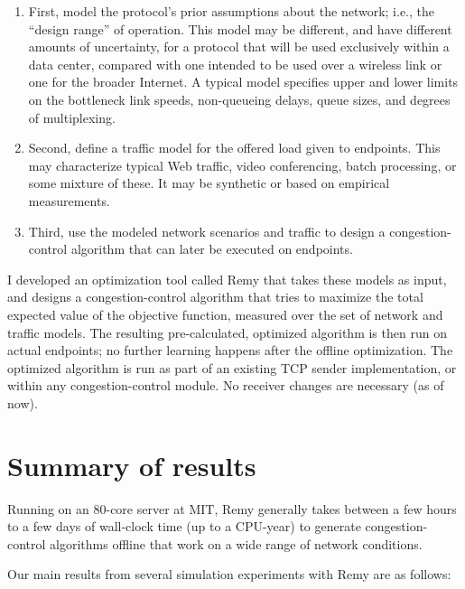 \begin{enumerate}

\item First, model the protocol's prior assumptions about the network;
  i.e., the ``design range'' of operation. This model
  may be different, and have different amounts of uncertainty, for a
  protocol that will be used exclusively within a data center,
  compared with one intended to be used over a wireless link or one
  for the broader Internet. A typical model specifies upper and lower
  limits on the bottleneck link speeds, non-queueing delays, queue
  sizes, and degrees of multiplexing.

\item Second, define a traffic model for the offered load given to
  endpoints. This may characterize typical Web traffic, video
  conferencing, batch processing, or some mixture of these. It may
  be synthetic or based on empirical measurements.

\item Third, use the modeled network scenarios and traffic to design a
  congestion-control algorithm that can later be executed on endpoints.

\end{enumerate}

I developed an optimization tool called Remy that takes these models
as input, and designs a congestion-control algorithm that tries to
maximize the total expected value of the objective function, measured
over the set of network and traffic models. The resulting
pre-calculated, optimized algorithm is then run on actual endpoints;
no further learning happens after the offline optimization. The
optimized algorithm is run as part of an existing TCP sender
implementation, or within any congestion-control module. No receiver
changes are necessary (as of now).

\section{Summary of results}

Running on an 80-core server at MIT, Remy generally takes between a
few hours to a few days of wall-clock time (up to a CPU-year) to
generate congestion-control algorithms offline that work on a wide
range of network conditions.

Our main results from several simulation experiments
with Remy are as follows:

